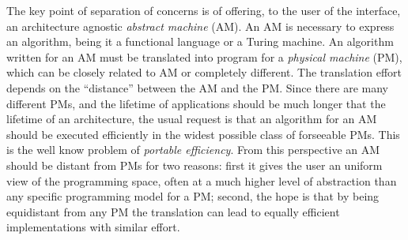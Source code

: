 The key point of separation of concerns is of offering, to the user of
the interface, an architecture agnostic {\em abstract machine}
(AM). An AM is necessary to express an algorithm, being it a
functional language or a Turing machine. An algorithm written for an
AM must be translated into program for a {\em physical machine} (PM),
which can be closely related to AM or completely different. The
translation effort depends on the ``distance'' between the AM and the
PM. Since there are many different PMs, and the lifetime of
applications should be much longer that the lifetime of an
architecture, the usual request is that an algorithm for an AM should
be executed efficiently in the widest possible class of forseeable
PMs. This is the well know problem of {\em portable efficiency}. From
this perspective an AM should be distant from PMs for two reasons:
first it gives the user an uniform view of the programming space,
often at a much higher level of abstraction than any specific
programming model for a PM; second, the hope is that by being
equidistant from any PM the translation can lead to equally efficient
implementations with similar effort.


